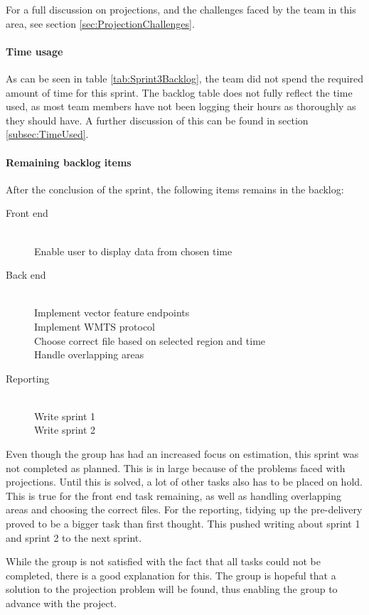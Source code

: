 \documentclass[11pt,a4paper,titlepage,oneside]{report}
\begin{document}
For a full discussion on projections, and the challenges faced by the team in this area, see section \ref{sec:ProjectionChallenges}. 

\paragraph{Time usage}
As can be seen in table \ref{tab:Sprint3Backlog}, the team did not spend the required amount of time for this sprint. The backlog table does not fully reflect the time used, as most team members have not been logging their hours as thoroughly as they should have. A further discussion of this can be found in section \ref{subsec:TimeUsed}.

\paragraph{Remaining backlog items}
After the conclusion of the sprint, the following items remains in the backlog:
\begin{description}
	\item[Front end] \hfill \\
	Enable user to display data from chosen time
	\item[Back end] \hfill \\
	Implement vector feature endpoints \hfill \\
	Implement \gls{WMTS} \gls{protocol} \hfill \\
	Choose correct file based on selected region and time \hfill \\
	Handle overlapping areas 
	\item[Reporting] \hfill \\
	Write sprint 1 \hfill \\
	Write sprint 2
\end{description}

Even though the group has had an increased focus on estimation, this sprint was not completed as planned. This is in large because of the problems faced with projections. Until this is solved, a lot of other tasks also has to be placed on hold. This is true for the front end task remaining, as well as handling overlapping areas and choosing the correct files. For the reporting, tidying up the \gls{pre-delivery} proved to be a bigger task than first thought. This pushed writing about sprint 1 and sprint 2 to the next sprint.  

While the group is not satisfied with the fact that all tasks could not be completed, there is a good explanation for this. The group is hopeful that a solution to the projection problem will be found, thus enabling the group to advance with the project. 
\end{document}
